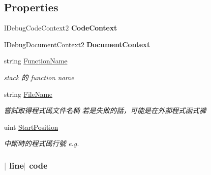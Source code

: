 \subsection*{Properties}
\begin{DoxyCompactItemize}
\item 
\hypertarget{classlib_wather_debugger_1_1_document_context_1_1_code_information_a834a91af13eeea3b2a4920a14229d220}{I\+Debug\+Code\+Context2 {\bfseries Code\+Context}}\label{classlib_wather_debugger_1_1_document_context_1_1_code_information_a834a91af13eeea3b2a4920a14229d220}

\item 
\hypertarget{classlib_wather_debugger_1_1_document_context_1_1_code_information_a405b6bb7c272756b5adbb14dd7394e5c}{I\+Debug\+Document\+Context2 {\bfseries Document\+Context}}\label{classlib_wather_debugger_1_1_document_context_1_1_code_information_a405b6bb7c272756b5adbb14dd7394e5c}

\item 
string \hyperlink{classlib_wather_debugger_1_1_document_context_1_1_code_information_a1aaf601fc22c656728294f2c5f80db3c}{Function\+Name}
\begin{DoxyCompactList}\small\item\em stack 的 function name \end{DoxyCompactList}\item 
string \hyperlink{classlib_wather_debugger_1_1_document_context_1_1_code_information_a58a573d3666349cd8f84e68a22f2210d}{File\+Name}
\begin{DoxyCompactList}\small\item\em 嘗試取得程式碼文件名稱 若是失敗的話，可能是在外部程式函式褲 \end{DoxyCompactList}\item 
uint \hyperlink{classlib_wather_debugger_1_1_document_context_1_1_code_information_a68ab02f74990ba0b88b32bb02410d749}{Start\+Position}
\begin{DoxyCompactList}\small\item\em 中斷時的程式碼行號 e.\+g. \subsubsection*{$\vert$ line$\vert$ code }


\end{DoxyCompactList}
\end{DoxyCompactItemize}

